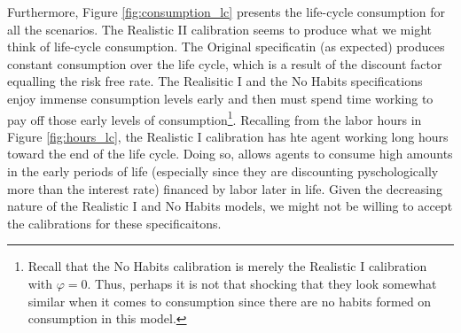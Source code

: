 \documentclass[ProjectMMD]{subfiles}
\begin{document}
\renewcommand{\figName}{consumption_lc}
\renewcommand{\figFile}{\figName}
\hypertarget{\figFile}{}

Furthermore, Figure \ref{fig:consumption_lc} presents the life-cycle consumption for all the scenarios. The  Realistic II calibration seems to produce what we might think of life-cycle consumption. The Original specificatin (as expected) produces constant consumption over the life cycle, which is a result of the discount factor equalling the risk free rate. The Realisitic I and the No Habits specifications enjoy immense consumption levels early and then must spend time working to pay off those early levels of consumption\footnote{Recall that the No Habits calibration is merely the Realistic I calibration with $\varphi=0$. Thus, perhaps it is not that shocking that they look somewhat similar when it comes to consumption since there are no habits formed on consumption in this model.}. Recalling from the labor hours in Figure \ref{fig:hours_lc}, the Realistic I calibration has hte agent working long hours toward the end of the life cycle. Doing so, allows agents to consume high amounts in the early periods of life (especially since they are discounting pyschologically more than the interest rate) financed by labor later in life. Given the decreasing nature of the Realistic I and No Habits models, we might not be willing to accept the calibrations for these specificaitons. 
\end{document}
